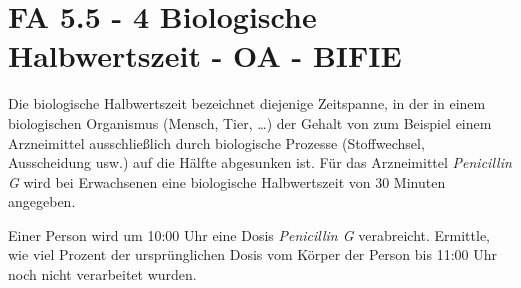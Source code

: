 \section{FA 5.5 - 4 Biologische Halbwertszeit - OA - BIFIE}


\begin{beispiel}[FA 5.5]{1} %
Die biologische Halbwertszeit bezeichnet diejenige Zeitspanne, in der in einem biologischen
Organismus (Mensch, Tier, \ldots) der Gehalt von zum Beispiel einem Arzneimittel ausschließlich durch biologische Prozesse (Stoffwechsel, Ausscheidung usw.) auf die Hälfte abgesunken ist. Für das Arzneimittel \textit{Penicillin G} wird bei Erwachsenen eine biologische Halbwertszeit von 30 Minuten angegeben. 
\leer

Einer Person wird um 10:00 Uhr eine Dosis \textit{Penicillin G} verabreicht.
Ermittle, wie viel Prozent der ursprünglichen Dosis vom Körper der Person bis 11:00 Uhr noch nicht verarbeitet wurden.


\end{beispiel}